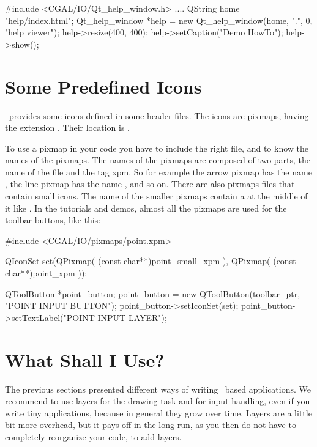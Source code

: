 \ccExample
\begin{ccExampleCode}
    #include <CGAL/IO/Qt_help_window.h>
        ....
    QString home = "help/index.html";
    Qt_help_window *help = new Qt_help_window(home, ".", 0, "help viewer");
    help->resize(400, 400);
    help->setCaption("Demo HowTo");
    help->show();
\end{ccExampleCode}

\section{Some Predefined Icons}
\label{The predefined icons}

\cgal\ provides some icons defined in some header files. The icons are
pixmaps, having the extension . Their location is .

To use a pixmap in your code you have to include the right file, and
to know the names of the pixmaps. The names of the pixmaps are
composed of two parts, the name of the file and the tag xpm. So for
example the arrow pixmap has the name , the line
pixmap has the name , and so on. There are also 
pixmaps files that contain small icons. The name of the smaller 
pixmaps contain a  at the middle of it like .
In the tutorials and demos, almost all the pixmaps are used for the 
toolbar buttons, like this:

\ccExample
\begin{ccExampleCode}
    
    #include <CGAL/IO/pixmaps/point.xpm>
    
    QIconSet set(QPixmap( (const char**)point_small_xpm ),
                  QPixmap( (const char**)point_xpm ));

    QToolButton *point_button;
    point_button = new QToolButton(toolbar_ptr, "POINT INPUT BUTTON");
    point_button->setIconSet(set);
    point_button->setTextLabel("POINT INPUT LAYER");

\end{ccExampleCode}



\section{What Shall I Use?}

The previous sections presented different ways of writing \cgalqt\ based 
applications. We recommend to use layers for the drawing task and for
input handling, even if you write tiny applications, because in general
they grow over time. Layers are a little bit more overhead, but 
it pays off in the long run, as you then do not have to completely
reorganize your code, to add layers. 








